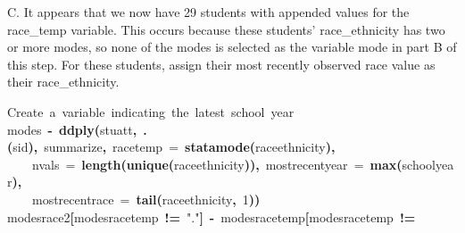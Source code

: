 \documentclass[12pt]{article}
\makeatletter
\newcommand{\hlnumber}[1]{\textcolor[rgb]{0,0,0}{#1}}%
\newcommand{\hlfunctioncall}[1]{\textcolor[rgb]{0.501960784313725,0,0.329411764705882}{\textbf{#1}}}%
\newcommand{\hlstring}[1]{\textcolor[rgb]{0.6,0.6,1}{#1}}%
\newcommand{\hlkeyword}[1]{\textcolor[rgb]{0,0,0}{\textbf{#1}}}%
\newcommand{\hlargument}[1]{\textcolor[rgb]{0.690196078431373,0.250980392156863,0.0196078431372549}{#1}}%
\newcommand{\hlcomment}[1]{\textcolor[rgb]{0.180392156862745,0.6,0.341176470588235}{#1}}%
\newcommand{\hlassignement}[1]{\textcolor[rgb]{0,0,0}{\textbf{#1}}}%
\newcommand{\hlsymbol}[1]{\textcolor[rgb]{0,0,0}{#1}}%
\newcommand{\hlstd}[1]{\textcolor[rgb]{0,0,0}{#1}}%
\newenvironment{kframe}{%
 \def\FrameCommand##1{\hskip\@totalleftmargin \hskip-\fboxsep
 \colorbox{shadecolor}{##1}\hskip-\fboxsep
     \hskip-\linewidth \hskip-\@totalleftmargin \hskip\columnwidth}%
 \MakeFramed {\advance\hsize-\width
   \@totalleftmargin\z@ \linewidth\hsize
   \@setminipage}}%
 {\par\unskip\endMakeFramed}
\newenvironment{knitrout}{}{} %
\renewenvironment{knitrout}{\begin{footnotesize}}{\end{footnotesize}}
\makeatother
\begin{document}
C. It appears that we now have 29 students with appended values for the race\_temp variable. This occurs because these students'
race\_ethnicity has two or more modes, so none of the modes is selected as the variable mode in part B of this step.  For these 
students, assign their most recently observed race value as their race\_ethnicity.

\begin{knitrout}
\color{fgcolor}\begin{kframe}
\begin{flushleft}
\ttfamily\noindent
\hlcomment{\usebox{\hlnormalsizeboxhash}{\ }Create{\ }a{\ }variable{\ }indicating{\ }the{\ }latest{\ }school{\ }year}\hspace*{\fill}\\
\hlstd{}\hlsymbol{modes}{\ }\hlassignement{\usebox{\hlnormalsizeboxlessthan}-}{\ }\hlfunctioncall{ddply}\hlkeyword{(}\hlsymbol{stuatt}\hlkeyword{,}{\ }\hlfunctioncall{.}\hlkeyword{(}\hlsymbol{sid}\hlkeyword{)}\hlkeyword{,}{\ }\hlsymbol{summarize}\hlkeyword{,}{\ }\hlargument{race\usebox{\hlnormalsizeboxunderscore}temp}{\ }\hlargument{=}{\ }\hlfunctioncall{statamode}\hlkeyword{(}\hlsymbol{race\usebox{\hlnormalsizeboxunderscore}ethnicity}\hlkeyword{)}\hlkeyword{,}\hspace*{\fill}\\
\hlstd{}{\ }{\ }{\ }{\ }\hlargument{nvals}{\ }\hlargument{=}{\ }\hlfunctioncall{length}\hlkeyword{(}\hlfunctioncall{unique}\hlkeyword{(}\hlsymbol{race\usebox{\hlnormalsizeboxunderscore}ethnicity}\hlkeyword{)}\hlkeyword{)}\hlkeyword{,}{\ }\hlargument{most\usebox{\hlnormalsizeboxunderscore}recent\usebox{\hlnormalsizeboxunderscore}year}{\ }\hlargument{=}{\ }\hlfunctioncall{max}\hlkeyword{(}\hlsymbol{school\usebox{\hlnormalsizeboxunderscore}year}\hlkeyword{)}\hlkeyword{,}\hspace*{\fill}\\
\hlstd{}{\ }{\ }{\ }{\ }\hlargument{most\usebox{\hlnormalsizeboxunderscore}recent\usebox{\hlnormalsizeboxunderscore}race}{\ }\hlargument{=}{\ }\hlfunctioncall{tail}\hlkeyword{(}\hlsymbol{race\usebox{\hlnormalsizeboxunderscore}ethnicity}\hlkeyword{,}{\ }\hlnumber{1}\hlkeyword{)}\hlkeyword{)}\hspace*{\fill}\\
\hlstd{}\hlsymbol{modes}\hlkeyword{\usebox{\hlnormalsizeboxdollar}}\hlsymbol{race2}\hlkeyword{[}\hlsymbol{modes}\hlkeyword{\usebox{\hlnormalsizeboxdollar}}\hlsymbol{race\usebox{\hlnormalsizeboxunderscore}temp}{\ }\hlkeyword{!=}{\ }\hlstring{"{}."{}}\hlkeyword{]}{\ }\hlassignement{\usebox{\hlnormalsizeboxlessthan}-}{\ }\hlsymbol{modes}\hlkeyword{\usebox{\hlnormalsizeboxdollar}}\hlsymbol{race\usebox{\hlnormalsizeboxunderscore}temp}\hlkeyword{[}\hlsymbol{modes}\hlkeyword{\usebox{\hlnormalsizeboxdollar}}\hlsymbol{race\usebox{\hlnormalsizeboxunderscore}temp}{\ }\hlkeyword{!=}\hspace*{\fill}\\

\end{flushleft}
\end{kframe}
\end{knitrout}
\end{document}
